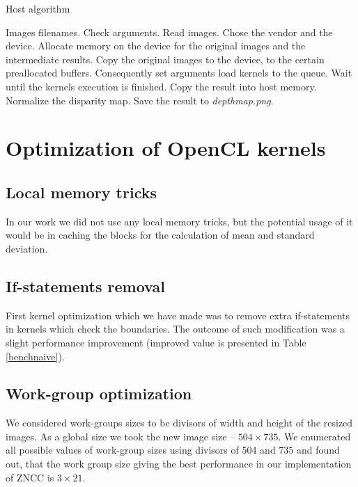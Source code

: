 \documentclass[conference]{IEEEtran}
\begin{document}
 \begin{algorithm}
 \caption{Host algorithm}\label{hostcode}
 \begin{algorithmic}[1]
 \renewcommand{\algorithmicrequire}{\textbf{Input:}}
 \renewcommand{\algorithmicensure}{\textbf{Output:}}
 \REQUIRE Images filenames.
  \STATE Check arguments.
  \STATE Read images.
  \STATE Chose the vendor and the device.
  \STATE Allocate memory on the device for the original images and the intermediate results.
  \STATE Copy the original images to the device, to the certain preallocated buffers.
  \STATE Consequently set arguments load kernels to the queue.
  \STATE Wait until the kernels execution is finished.
  \STATE Copy the result into host memory.
  \STATE Normalize the disparity map.
  \STATE Save the result to \textit{depthmap.png}.
 \end{algorithmic} 
 \end{algorithm}

\section{Optimization of OpenCL kernels}\label{sec:Optimization}
\subsection{Local memory tricks} 
In our work we did not use any local memory tricks, but the potential usage of it would be in caching the blocks for the calculation of mean and standard deviation.

\subsection{If-statements removal}
First kernel optimization which we have made was to remove extra if-statements in kernels which check the boundaries. The outcome of such modification was a slight performance improvement (improved value is presented in Table \ref{benchnaive}).

\subsection{Work-group optimization}
We considered work-groups sizes to be divisors of width and height of the resized images. As a global size we took the new image size -- $504\times735$. We enumerated all possible values of work-group sizes using divisors of 504 and 735 and found out, that the work group size giving the best performance in our implementation of ZNCC is $3\times21$.
\end{document}
